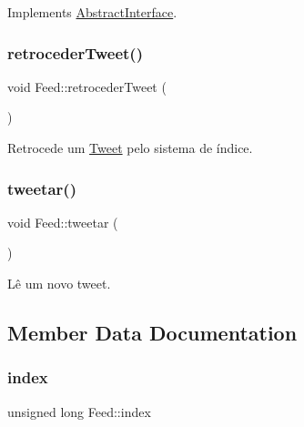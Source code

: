 Implements \hyperlink{class_abstract_interface_acf8223a1da27c6986158836a57fa51ee}{Abstract\+Interface}.

\mbox{\label{class_feed_a0ddcec41ebdc9c0c5083de40463229cc}} 
\subsubsection{\texorpdfstring{retroceder\+Tweet()}{retrocederTweet()}}
{\footnotesize\ttfamily void Feed\+::retroceder\+Tweet (\begin{DoxyParamCaption}{ }\end{DoxyParamCaption})\hspace{0.3cm}{\ttfamily [private]}}



Retrocede um \hyperlink{class_tweet}{Tweet} pelo sistema de índice. 

\mbox{\label{class_feed_ab5eb6b52ae8ab029ea508cf09bee54bd}} 
\subsubsection{\texorpdfstring{tweetar()}{tweetar()}}
{\footnotesize\ttfamily void Feed\+::tweetar (\begin{DoxyParamCaption}{ }\end{DoxyParamCaption})\hspace{0.3cm}{\ttfamily [private]}}



Lê um novo tweet. 



\subsection{Member Data Documentation}
\mbox{\label{class_feed_a50b41b766279c79a17506ff536ab38bd}} 
\subsubsection{\texorpdfstring{index}{index}}
{\footnotesize\ttfamily unsigned long Feed\+::index\hspace{0.3cm}{\ttfamily [private]}}

